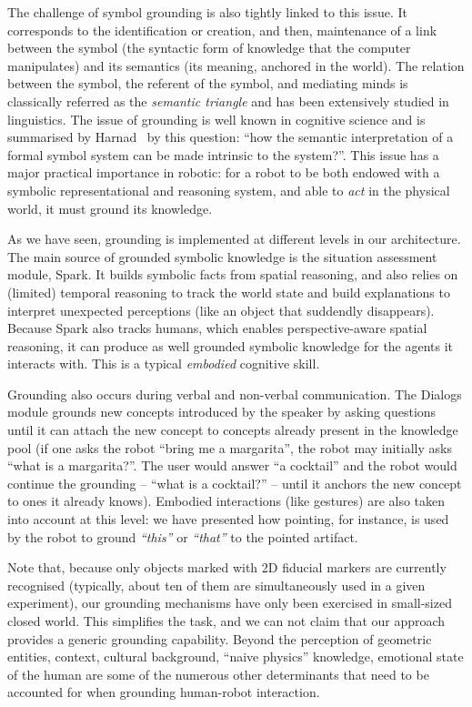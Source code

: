 \documentclass[preprint,3p,times]{elsarticle}
\begin{document}
The challenge of symbol grounding is also tightly linked to this issue. It
corresponds to the identification or creation, and then, maintenance of a link
between the symbol (the syntactic form of knowledge that the computer
manipulates) and its semantics (its meaning, anchored in the world). The
relation between the symbol, the referent of the symbol, and mediating minds
is classically referred as the \emph{semantic triangle} and has been
extensively studied in linguistics. The issue of grounding is well known in
cognitive science and is summarised by Harnad~\cite{Harnad1990} by this
question: ``how the semantic interpretation of a formal symbol system can be
made intrinsic to the system?''. This issue has a major practical importance in
robotic: for a robot to be both endowed with a symbolic representational and
reasoning system, and able to \emph{act} in the physical world, it must ground
its knowledge.

As we have seen, grounding is implemented at different levels in our
architecture. The main source of grounded symbolic knowledge is the situation
assessment module, {\sc Spark}. It builds symbolic facts from spatial reasoning,
and also relies on (limited) temporal reasoning to track the world state and
build explanations to interpret unexpected perceptions (like an object that
suddendly disappears). Because {\sc Spark} also tracks humans, which enables
perspective-aware spatial reasoning, it can produce as well grounded symbolic
knowledge for the agents it interacts with. This is a typical \emph{embodied}
cognitive skill.

Grounding also occurs during verbal and non-verbal communication. The {\sc
Dialogs} module grounds new concepts introduced by the speaker by asking
questions until it can attach the new concept to concepts already present in the
knowledge pool (if one asks the robot ``bring me a margarita'', the robot may
initially asks ``what is a margarita?''. The user would answer ``a cocktail''
and the robot would continue the grounding -- ``what is a cocktail?'' -- until
it anchors the new concept to ones it already knows). Embodied interactions
(like gestures) are also taken into account at this level: we have presented how
pointing, for instance, is used by the robot to ground \emph{``this''} or
\emph{``that''} to the pointed artifact.

Note that, because only objects marked with 2D fiducial markers are currently
recognised (typically, about ten of them are simultaneously used in a given
experiment), our grounding mechanisms have only been exercised in small-sized
closed world. This simplifies the task, and we can not claim that our approach
provides a generic grounding capability. Beyond the perception of geometric
entities, context, cultural background, ``naive physics'' knowledge, emotional
state of the human are some of the numerous other determinants that need to be
accounted for when grounding human-robot interaction.
\end{document}
